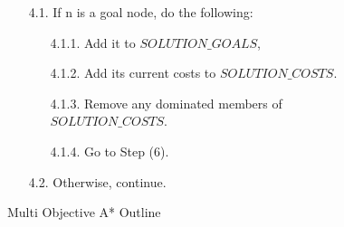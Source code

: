 \begin{figure}
\begin{itemize}
\begin{itemize}
  	\item[4.1. ] If n is a goal node, do the following:
  	\begin{itemize}
  		\item[4.1.1. ] Add it to $SOLUTION\_GOALS$,
  		\item[4.1.2. ] Add its current costs to $SOLUTION\_COSTS$.
  		\item[4.1.3. ] Remove any dominated members of $SOLUTION\_COSTS$.
  		\item[4.1.4. ] Go to Step (6).
  	\end{itemize}
  	\item[4.2. ] Otherwise, continue.
  \end{itemize}
\end{itemize}
\caption{Multi Objective A* Outline}
\label{fig:algMOA}
\end{figure}

